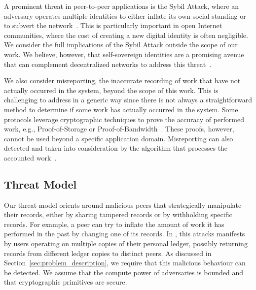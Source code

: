 A prominent threat in peer-to-peer applications is the Sybil Attack, where an adversary operates multiple identities to either inflate its own social standing or to subvert the network~\cite{douceur2002sybil}.
This is particularly important in open Internet communities, where the cost of creating a new digital identity is often negligible.
We consider the full implications of the Sybil Attack outside the scope of our work.
We believe, however, that self-sovereign identities are a promising avenue that can complement decentralized networks to address this threat~\cite{stokkink2018deployment}.

We also consider misreporting, the inaccurate recording of work that have not actually occurred in the system, beyond the scope of this work.
This is challenging to address in a generic way since there is not always a straightforward method to determine if some work has actually occurred in the system.
Some protocols leverage cryptographic techniques to prove the accuracy of performed work, e.g., Proof-of-Storage or Proof-of-Bandwidth~\cite{benet2018filecoin,ghosh2014torpath}.
These proofs, however, cannot be used beyond a specific application domain.
Misreporting can also detected and taken into consideration by the algorithm that processes the accounted work~\cite{seuken2010accounting}.

\subsection{Threat Model}
\label{sec:threat_model}
Our threat model orients around malicious peers that strategically manipulate their \ModelName{} records, either by sharing tampered records or by withholding specific records.
For example, a peer can try to inflate the amount of work it has performed in the past by changing one of its records.
In \ModelName{}, this attacks manifests by users operating on multiple copies of their personal ledger, possibly returning records from different ledger copies to distinct peers.
As discussed in Section~\ref{sec:problem_description}, we require that this malicious behaviour can be detected.
We assume that the compute power of adversaries is bounded and that cryptographic primitives are secure.


